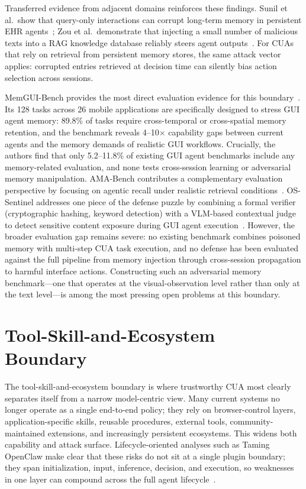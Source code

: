 Transferred evidence from adjacent domains reinforces these findings. Sunil et al.\ show that query-only interactions can corrupt long-term memory in persistent EHR agents~\cite{memorypoisoning2026}; Zou et al.\ demonstrate that injecting a small number of malicious texts into a RAG knowledge database reliably steers agent outputs~\cite{poisonedrag2025}. For CUAs that rely on retrieval from persistent memory stores, the same attack vector applies: corrupted entries retrieved at decision time can silently bias action selection across sessions.

MemGUI-Bench provides the most direct evaluation evidence for this boundary~\cite{memguibench2026}. Its 128 tasks across 26 mobile applications are specifically designed to stress GUI agent memory: 89.8\% of tasks require cross-temporal or cross-spatial memory retention, and the benchmark reveals 4--10$\times$ capability gaps between current agents and the memory demands of realistic GUI workflows. Crucially, the authors find that only 5.2--11.8\% of existing GUI agent benchmarks include any memory-related evaluation, and none tests cross-session learning or adversarial memory manipulation. AMA-Bench contributes a complementary evaluation perspective by focusing on agentic recall under realistic retrieval conditions~\cite{amabench2025}. OS-Sentinel addresses one piece of the defense puzzle by combining a formal verifier (cryptographic hashing, keyword detection) with a VLM-based contextual judge to detect sensitive content exposure during GUI agent execution~\cite{ossentinel2025}. However, the broader evaluation gap remains severe: no existing benchmark combines poisoned memory with multi-step CUA task execution, and no defense has been evaluated against the full pipeline from memory injection through cross-session propagation to harmful interface actions. Constructing such an adversarial memory benchmark---one that operates at the visual-observation level rather than only at the text level---is among the most pressing open problems at this boundary.

\section{Tool-Skill-and-Ecosystem Boundary}
\label{sec:ecosystem}

The tool-skill-and-ecosystem boundary is where trustworthy CUA most clearly separates itself from a narrow model-centric view. Many current systems no longer operate as a single end-to-end policy; they rely on browser-control layers, application-specific skills, reusable procedures, external tools, community-maintained extensions, and increasingly persistent ecosystems. This widens both capability and attack surface. Lifecycle-oriented analyses such as Taming OpenClaw make clear that these risks do not sit at a single plugin boundary; they span initialization, input, inference, decision, and execution, so weaknesses in one layer can compound across the full agent lifecycle~\cite{tamingopenclaw2026}.


